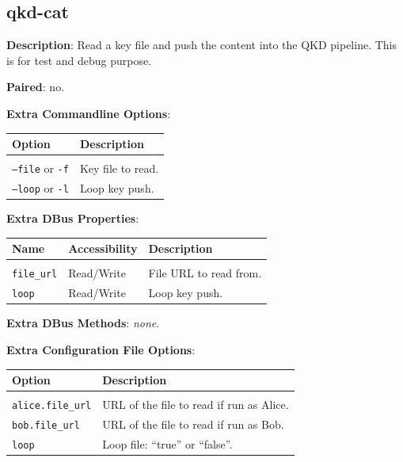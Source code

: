 \subsection{qkd-cat}
\label{subsec:qkd-cat}

\textbf{Description}: Read a key file and push the content into the QKD pipeline. This is for test and debug purpose.

\bigskip

\noindent \textbf{Paired}: no.

\bigskip

\noindent \textbf{Extra Commandline Options}:

\medskip

\begin{tabular}{lp{10cm}}

Option                            & Description \\
\hline
\\
\texttt{--file} or \texttt{-f}    & Key file to read. \\ [0.5em]
\texttt{--loop} or \texttt{-l}    & Loop key push. \\ [0.5em]

\end{tabular}

\bigskip

\noindent \textbf{Extra DBus Properties}:

\medskip

\begin{tabular}{llp{7cm}}

Name                    & Accessibility &   Description \\
\hline
\\
\texttt{file\_url}      & Read/Write    &   File URL to read from. \\ [0.5em]
\texttt{loop}           & Read/Write    &   Loop key push. \\ [0.5em]

\end{tabular}

\bigskip

\noindent \textbf{Extra DBus Methods}: \emph{none}.

\bigskip

\noindent \textbf{Extra Configuration File Options}: 

\medskip

\begin{tabular}{lp{9cm}}

Option                      & Description \\
\hline
\\
\texttt{alice.file\_url}    & URL of the file to read if run as Alice. \\ [0.5em]
\texttt{bob.file\_url}      & URL of the file to read if run as Bob. \\ [0.5em]
\texttt{loop}               & Loop file: ``true'' or ``false''. \\ [0.5em]

\end{tabular}

